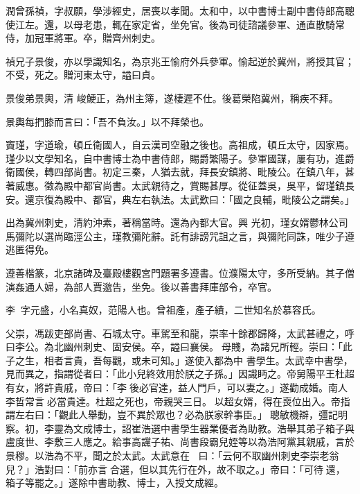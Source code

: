 \begin{pinyinscope}
 潤曾孫禎，字叔願，學涉經史，居喪以孝聞。太和中，以中書博士副中書侍郎高聰使江左。還，以母老患，輒在家定省，坐免官。後為司徒諮議參軍、通直散騎常侍，加冠軍將軍。卒，贈齊州刺史。



 禎兄子景俊，亦以學識知名，為京兆王愉府外兵參軍。愉起逆於冀州，將授其官；不受，死之。贈河東太守，謚曰貞。



 景俊弟景輿，清
 峻鯁正，為州主簿，遂棲遲不仕。後葛榮陷冀州，稱疾不拜。



 景輿每捫膝而言曰：「吾不負汝。」以不拜榮也。



 竇瑾，字道瑜，頓丘衛國人，自云漢司空融之後也。高祖成，頓丘太守，因家焉。瑾少以文學知名，自中書博士為中書侍郎，賜爵繁陽子。參軍國謀，屢有功，進爵衛國侯，轉四部尚書。初定三秦，人猶去就，拜長安鎮將、毗陵公。在鎮八年，甚著威惠。徵為殿中都官尚書。太武親待之，賞賜甚厚。從征蓋吳，吳平，留瑾鎮長安。還京復為殿中、都官，典左右執法。太武歎曰：「國之良輔，毗陵公之謂矣。」



 出為冀州刺史，清約沖素，著稱當時。還為內都大官。興
 光初，瑾女婿鬱林公司馬彌陀以選尚臨涇公主，瑾教彌陀辭。託有誹謗咒詛之言，與彌陀同誅，唯少子遵逃匿得免。



 遵善楷篆，北京諸碑及臺殿樓觀宮門題署多遵書。位濮陽太守，多所受納。其子僧演姦通人婦，為部人賈邈告，坐免。後以善書拜庫部令，卒官。



 李，字元盛，小名真奴，范陽人也。曾祖產，產子績，二世知名於慕容氏。



 父崇，馮跋吏部尚書、石城太守。車駕至和龍，崇率十餘郡歸降，太武甚禮之，呼曰李公。為北幽州刺史、固安侯。卒，謚曰襄侯。母賤，為諸兄所輕。崇曰：「此子之生，相者言貴，吾每觀，或未可知。」遂使入都為中
 書學生。太武幸中書學，見而異之，指謂從者曰：「此小兒終效用於朕之子孫。」因識眄之。帝舅陽平王杜超有女，將許貴戚，帝曰：「李後必官達，益人門戶，可以妻之。」遂勸成婚。南人李哲常言必當貴達。杜超之死也，帝親哭三日。以超女婿，得在喪位出入。帝指謂左右曰：「觀此人舉動，豈不異於眾也？必為朕家幹事臣。」聰敏機辯，彊記明察。初，李靈為文成博士，詔崔浩選中書學生器業優者為助教。浩舉其弟子箱子與盧度世、李敷三人應之。給事高讜子祐、尚書段霸兒姪等以為浩阿黨其親戚，言於景穆。以浩為不平，聞之於太武。太武意在
 ，曰：「云何不取幽州刺史李崇老翁兒？」浩對曰：「前亦言合選，但以其先行在外，故不取之。」帝曰：「可待還，箱子等罷之。」遂除中書助教、博士，入授文成經。




\end{pinyinscope}
